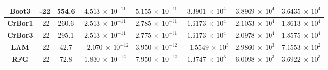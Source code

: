 \documentclass[12pt]{article}
\begin{document}
\begin{table}[H]
{\begin{tabular}{|c|c|c|c|c|c|c|c|}
        \textbf{Boot3}                                        & -22                                                          & 554.6                                                    & $4.513 \: \times \: 10^{-11}$                                     & $5.155 \: \times \: 10^{-11}$                                     & $3.3901 \: \times \: 10^{4}$                                       & $3.8969 \: \times \: 10^{4}$                                       & $3.6435 \: \times \: 10^{4}$                                      \\ \hline
        \textbf{CrBor1}                                       & -22                                                          & 260.6                                                    & $2.513 \: \times \: 10^{-11}$                                     & $2.785 \: \times \: 10^{-11}$                                     & $1.6173 \: \times \: 10^{4}$                                       & $2.1053 \: \times \: 10^{4}$                                       & $1.8613 \: \times \: 10^{4}$                                      \\ \hline
        \textbf{CrBor3}                                       & -22                                                          & 295.1                                                    & $2.513 \: \times \: 10^{-11}$                                     & $2.775 \: \times \: 10^{-11}$                                     & $1.6173 \: \times \: 10^{4}$                                       & $2.0978 \: \times \: 10^{4}$                                       & $1.8575 \: \times \: 10^{4}$                                      \\ \hline
        \textbf{LAM}                                          & -22                                                          & 42.7                                                     & $-2.070 \: \times \: 10^{-12}$                                    & $3.950 \: \times \: 10^{-12}$                                     & $-1.5549 \: \times \: 10^{3}$                                      & $2.9860 \: \times \: 10^{3}$                                       & $7.1553 \: \times \: 10^{2}$                                      \\ \hline
        \textbf{RFG}                                          & -22                                                          & 72.8                                                     & $1.830 \: \times \: 10^{-12}$                                     & $7.950 \: \times \: 10^{-12}$                                     & $1.3747 \: \times \: 10^{3}$                                       & $6.0098 \: \times \: 10^{3}$                                       & $3.6922 \: \times \: 10^{3}$                                      \\ \hline
        \end{tabular}

}
\end{table}
\end{document}
